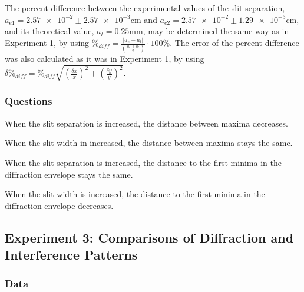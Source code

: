 \documentclass[12pt]{article}
\begin{document}
\qq The percent difference between the experimental values of the slit
separation, \(a_{e1} = \num{2.57e-2} \pm \num{2.57e-3} \si{\centi\meter}\) and
\(a_{e2} = \num{2.57e-2} \pm \num{1.29e-3} \si{\centi\meter}\), and its
theoretical value, \(a_t = 0.25 \si{\milli\meter}\), may be determined the same
way as in Experiment 1, by using
\(\%_{diff} = \frac{\left| a_e - a_t \right|}{\left( \frac{a_e + a_t}{2}
  \right)} \cdot 100\% \). The error of the percent difference was also
calculated as it was in Experiment 1, by using
\(\delta \%_{diff} = \%_{diff} \sqrt{\left( \frac{\delta x}{x} \right) ^2 +
  \left( \frac{\delta y}{y} \right) ^2 } \).

\subsubsection{Questions}

\subsubsubsection{}

\qq When the slit separation is increased, the distance between maxima
decreases.

\subsubsubsection{}

\qq When the slit width in increased, the distance between maxima stays the
same.

\subsubsubsection{}

\qq When the slit separation is increased, the distance to the first minima in the
diffraction envelope stays the same.

\subsubsubsection{}

When the slit width is increased, the distance to the first minima in the
diffraction envelope decreases.



\subsection{Experiment 3: Comparisons of Diffraction and Interference Patterns}

\subsubsection{Data}
\end{document}
